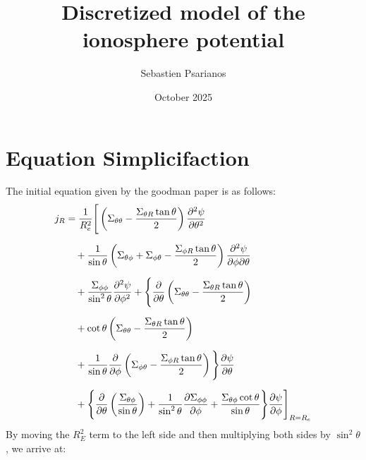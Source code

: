 \documentclass{article}
\title{\vspace{-4cm} Discretized model of the ionosphere potential}
\author{Sebastien Psarianos} \date{October 2025}
\begin{document}
\maketitle
\section{Equation Simplicifaction}

The initial equation given by the goodman paper is as follows:
\begin{equation*}
	\begin{aligned}
		j_R
		 & = \frac1{R_e^2} \Bigg[
			\left( \Sigma_{\theta\theta} - \frac{\Sigma_{\theta R} \tan\theta}{2} \right)
		\pdv[2]{\psi}{\theta}                                                         \\[6pt]
		 & \quad + \frac1{\sin\theta}
		\left( \Sigma_{\theta\phi} + \Sigma_{\phi\theta} - \frac{\Sigma_{\phi R} \tan\theta}{2} \right)
		\pdv{\psi}{\phi}{\theta}                                                      \\[6pt]
		 & \quad + \frac{\Sigma_{\phi\phi}}{\sin^2\theta}
		\pdv[2]{\psi}{\phi} + \Bigg\{ \pdv{\theta}
		\left( \Sigma_{\theta\theta} - \frac{\Sigma_{\theta R} \tan\theta}{2} \right) \\[6pt]
		 & \quad + \cot\theta
		\left( \Sigma_{\theta\theta} - \frac{\Sigma_{\theta R} \tan\theta}{2} \right) \\[6pt]
		 & \quad + \frac1{\sin\theta} \pdv{\phi}
		\left( \Sigma_{\phi\theta} - \frac{\Sigma_{\phi R} \tan\theta}{2} \right)
		\Bigg\}\pdv{\psi}{\theta}                                                     \\[6pt]
		 & \quad + \Bigg\{\pdv{\theta}
		\left( \frac{\Sigma_{\theta\phi}}{\sin\theta} \right) +
		\frac1{\sin^2\theta}\pdv{\Sigma_{\phi\phi}}{\phi}
		+ \frac{\Sigma_{\theta\phi}\cot\theta}{\sin\theta}
		\Bigg\}\pdv{\psi}{\phi}
		\Bigg]_{R = R_e}
	\end{aligned}
\end{equation*}
By moving the $R_E^2$ term to the left side and then multiplying both sides by $\sin^2\theta$, we arrive at:
\end{document}
